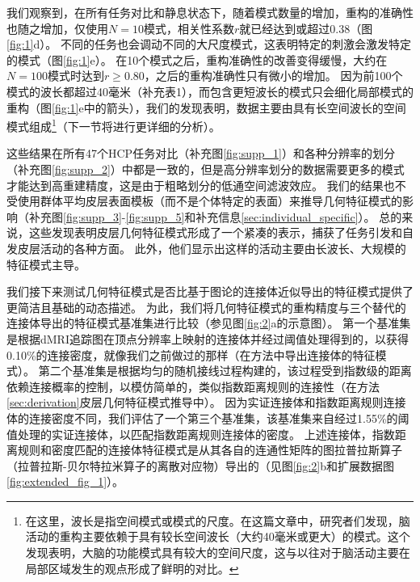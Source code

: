 \documentclass[lang=cn,a4paper,newtx]{elegantpaper}
\begin{document}
我们观察到，在所有任务对比和静息状态下，随着模式数量的增加，重构的准确性也随之增加，仅使用$ N=10 $模式，相关性系数$ r $就已经达到或超过0.38（图\ref{fig:1}d）。
不同的任务也会调动不同的大尺度模式，这表明特定的刺激会激发特定的模式（图\ref{fig:1}e）。
在10个模式之后，重构准确性的改善变得缓慢，大约在$ N=100 $模式时达到$ r \geq 0.80 $，之后的重构准确性只有微小的增加。
因为前100个模式的波长都超过40毫米（补充表1），而包含更短波长的模式只会细化局部模式的重构（图\ref{fig:1}e中的箭头），我们的发现表明，数据主要由具有长空间波长的空间模式组成\footnote{在这里，波长是指空间模式或模式的尺度。在这篇文章中，研究者们发现，脑活动的重构主要依赖于具有较长空间波长（大约40毫米或更大）的模式。这个发现表明，大脑的功能模式具有较大的空间尺度，这与以往对于脑活动主要在局部区域发生的观点形成了鲜明的对比。}（下一节将进行更详细的分析）。


这些结果在所有47个HCP任务对比（补充图\ref{fig:supp_1}）和各种分辨率的划分（补充图\ref{fig:supp_2}）中都是一致的，但是高分辨率划分的数据需要更多的模式才能达到高重建精度，这是由于粗略划分的低通空间滤波效应。
我们的结果也不受使用群体平均皮层表面模板（而不是个体特定的表面）来推导几何特征模式的影响（补充图\ref{fig:supp_3}-\ref{fig:supp_5}和补充信息\ref{sec:individual_specific}）。
总的来说，这些发现表明皮层几何特征模式形成了一个紧凑的表示，捕获了任务引发和自发皮层活动的各种方面。
此外，他们显示出这样的活动主要由长波长、大规模的特征模式主导。


我们接下来测试几何特征模式是否比基于图论的连接体近似导出的特征模式提供了更简洁且基础的动态描述。
为此，我们将几何特征模式的重构精度与三个替代的连接体导出的特征模式基准集进行比较（参见图\ref{fig:2}a的示意图）。
第一个基准集是根据dMRI追踪图在顶点分辨率上映射的连接体并经过阈值处理得到的，以获得0.10\%的连接密度，就像我们之前做过的那样（在方法中导出连接体的特征模式）。
第二个基准集是根据均匀的随机接线过程构建的，该过程受到指数级的距离依赖连接概率的控制，以模仿简单的，类似指数距离规则的连接性（在方法\ref{sec:derivation}皮层几何特征模式推导中）。
因为实证连接体和指数距离规则连接体的连接密度不同，我们评估了一个第三个基准集，该基准集来自经过1.55\%的阈值处理的实证连接体，以匹配指数距离规则连接体的密度。
上述连接体，指数距离规则和密度匹配的连接体特征模式是从其各自的连通性矩阵的图拉普拉斯算子（拉普拉斯-贝尔特拉米算子的离散对应物）导出的（见图\ref{fig:2}b和扩展数据图\ref{fig:extended_fig_1}）。
\end{document}
